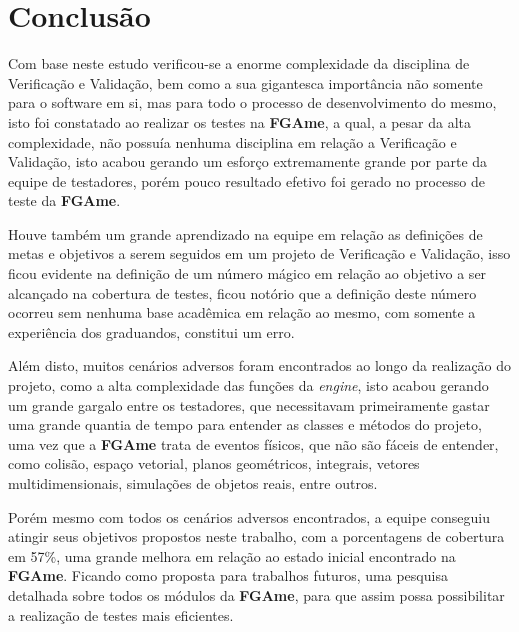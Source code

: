 \chapter{Conclusão}

Com base neste estudo verificou-se a enorme complexidade da disciplina de Verificação e Validação, bem como a sua gigantesca importância não somente para o software em si, mas para todo o processo de desenvolvimento do mesmo, isto foi constatado ao realizar os testes na \textbf{FGAme}, a qual, a pesar da alta complexidade, não possuía nenhuma disciplina em relação a Verificação e Validação, isto acabou gerando um esforço extremamente grande por parte da equipe de testadores, porém pouco resultado efetivo foi gerado no processo de teste da \textbf{FGAme}.

Houve também um grande aprendizado na equipe em relação as definições de metas e objetivos a serem seguidos em um projeto de Verificação e Validação, isso ficou evidente na definição de um número mágico em relação ao objetivo a ser alcançado na cobertura de testes, ficou notório que a definição deste número ocorreu sem nenhuma base acadêmica em relação ao mesmo, com somente a experiência dos graduandos, constitui um erro.

Além disto, muitos cenários adversos foram encontrados ao longo da realização do projeto, como a alta complexidade das funções da \textit{engine}, isto acabou gerando um grande gargalo entre os testadores, que necessitavam primeiramente gastar uma grande quantia de tempo para entender as classes e métodos do projeto, uma vez que a \textbf{FGAme} trata de eventos físicos, que não são fáceis de entender, como colisão, espaço vetorial, planos geométricos, integrais, vetores multidimensionais, simulações de objetos reais, entre outros.

Porém mesmo com todos os cenários adversos encontrados, a equipe conseguiu atingir seus objetivos propostos neste trabalho, com a porcentagens de cobertura em 57\%, uma grande melhora em relação ao estado inicial encontrado na \textbf{FGAme}. Ficando como proposta para trabalhos futuros, uma pesquisa detalhada sobre todos os módulos da \textbf{FGAme}, para que assim possa possibilitar a realização de testes mais eficientes.
